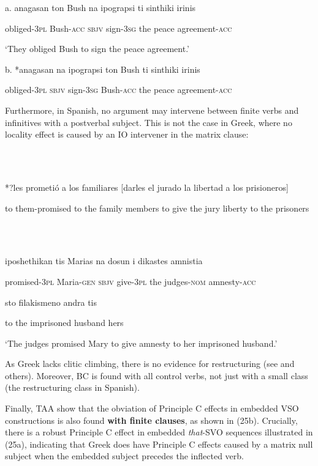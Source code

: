 \documentclass[output=paper]{langsci/langscibook}
\begin{document}
          a.  anagasan      ton Bush na     ipograpsi   ti sinthiki irinis

    obliged-\textsc{3pl}   Bush-\textsc{acc} \textsc{sbjv}    sign-\textsc{3sg}   the peace agreement-\textsc{acc}

    ‘They obliged Bush to sign the peace agreement.’

  b.   *anagasan   na   ipograpsi   ton Bush   ti sinthiki irinis

    obliged-\textsc{3pl}   \textsc{sbjv}  sign-\textsc{3sg}    Bush-\textsc{acc}   the peace agreement-\textsc{acc}

Furthermore, in Spanish, no argument may intervene between finite verbs and infinitives with a postverbal subject. This is not the case in Greek, where no locality effect is caused by an IO intervener in the matrix clause:

\ea%
    \label{ex:key:23}
    \gll\\
        \\
    \glt
    \z

          *?les prometió     a los familiares            [darles el jurado la libertad a los prisioneros] 

  to them-promised to the family members to give the jury liberty      to the prisoners

\ea%
    \label{ex:key:24}
    \gll\\
        \\
    \glt
    \z

          iposhethikan     tis Marias  na  dosun       i dikastes     amnistia   

  promised-\textsc{3pl}    Maria-\textsc{gen} \textsc{sbjv} give-\textsc{3pl} the judges-\textsc{nom}   amnesty-\textsc{acc}

  sto filakismeno      andra     tis

to the imprisoned husband hers

  ‘The judges promised Mary to give amnesty to her imprisoned husband.’

As Greek lacks clitic climbing, there is no evidence for restructuring (see \citealt{Terzi1992} and others). Moreover, BC is found with all control verbs, not just with a small class (the restructuring class in Spanish).

  Finally, TAA show that the obviation of Principle C effects in embedded VSO constructions is also found \textbf{with finite clauses}, as shown in (25b). Crucially, there is a robust Principle C effect in embedded \textit{that}{}-SVO sequences illustrated in (25a), indicating that Greek does have Principle C effects caused by a matrix null subject when the embedded subject precedes the inflected verb.
\end{document}
